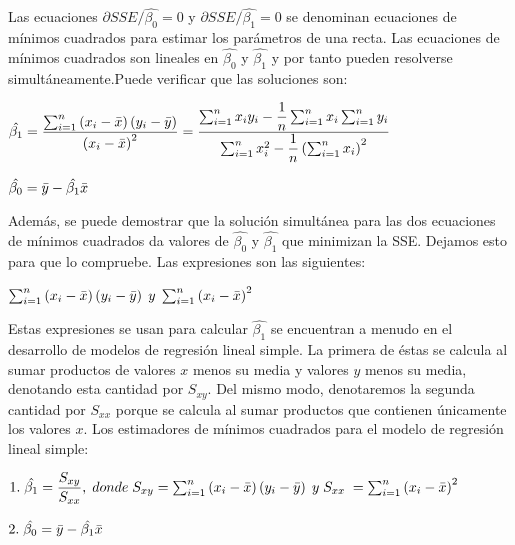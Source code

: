 Las ecuaciones $\partial SSE/\hat{\beta_{0}} = 0$ y $\partial SSE/\hat{\beta_{1}} = 0$ se denominan ecuaciones de mínimos cuadrados para estimar los parámetros de una recta. Las ecuaciones de mínimos cuadrados son lineales en $\hat{\beta_{0}}$ y $\hat{\beta_{1}}$ y por tanto pueden resolverse simultáneamente.Puede verificar que las soluciones son:




\begin{center}

$
{\large \hat{\beta_{1}}=\dfrac{\sum_{i=1}^{n}\left(x_{i}-\bar{x} \right) \left(y_{i}-\bar{y} \right)}{\left(x_{i}-\bar{x} \right)^{2}} = \dfrac{\sum_{i=1}^{n}x_{i}y_{i}-\dfrac{1}{n}\sum_{i=1}^{n}x_{i} \sum_{i=1}^{n}y_{i}}{\sum_{i=1}^{n}x^{2}_{i}-\dfrac{1}{n}\left( \sum_{i=1}^{n}x_{i}\right)^{2}}}
$


$
{\large \hat{\beta_{0}}=\bar{y}-\hat{\beta_{1}}\bar{x}}
$
\end{center}



Además, se puede demostrar que la solución simultánea para las dos ecuaciones de mínimos cuadrados da valores de $\hat{\beta_{0}}$ y $\hat{\beta_{1}}$ que minimizan la SSE. Dejamos esto para que lo compruebe. Las expresiones son las siguientes:



\begin{center}

$
{\large \sum_{i=1}^{n}\left(x_{i}-\bar{x} \right) \left(y_{i}-\bar{y} \right) \; y \; \sum_{i=1}^{n} \left(x_{i}-\bar{x} \right)^{2}}
$
\end{center}



Estas expresiones se usan para calcular $\hat{\beta_{1}} $ se encuentran a menudo en el desarrollo de modelos de regresión lineal simple. La primera de éstas se calcula al sumar productos de valores $x$ menos su media y valores $y$ menos su media, denotando esta cantidad
por $S_{xy}$. Del mismo modo, denotaremos la segunda cantidad por $S_{xx}$ porque se calcula al sumar productos que contienen únicamente los valores $x$. Los estimadores de mínimos cuadrados para el modelo de regresión lineal simple:


\begin{center}

$
{\large 1. \; \hat{\beta_{1}}=\dfrac{S_{xy}}{S_{xx}}, \; donde \; S_{xy}=\sum_{i=1}^{n}\left(x_{i}-\bar{x} \right) \left(y_{i}-\bar{y} \right) \; y\; S_{xx}\;= \sum_{i=1}^{n} \left(x_{i}-\bar{x} \right)^{2}}  
$

$
{\large 2.\; \hat{\beta_{0}}=\bar{y}-\hat{\beta_{1}}\bar{x} }
$
\end{center}


